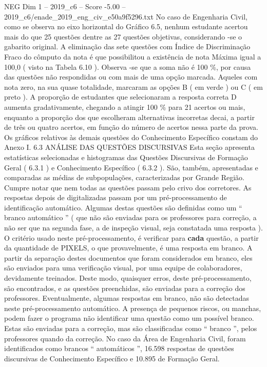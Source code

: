 \begin{textsample}{NEG Dim 1 – 2019\_c6 – Score -5.00 – 2019\_c6/enade\_2019\_eng\_civ\_e50a9f5296.txt}
No caso de Engenharia Civil, como se observa no eixo horizontal do Gráfico 6.5, nenhum estudante acertou mais do que 25 questões dentre as 27 questões objetivas, considerando -se o gabarito original.
A eliminação das sete questões com Índice de Discriminação Fraco do cômputo da nota é que possibilitou a existência de nota Máxima igual a 100,0 ( visto na Tabela 6.10 ).
Observa -se que a soma não é 100 \%, por causa das questões não respondidas ou com mais de uma opção marcada.
Aqueles com nota zero, na sua quase totalidade, marcaram as opções B ( em verde ) ou C ( em preto ).
A proporção de estudantes que selecionaram a resposta correta D aumenta gradativamente, chegando a atingir 100 \% para 21 acertos ou mais, enquanto a proporção dos que escolheram alternativas incorretas decai, a partir de três ou quatro acertos, em função do número de acertos nessa parte da prova.
Os gráficos relativos às demais questões do Conhecimento Específico constam do Anexo I. 6.3 ANÁLISE DAS QUESTÕES DISCURSIVAS Esta seção apresenta estatísticas selecionadas e histogramas das Questões Discursivas de Formação Geral ( 6.3.1 ) e Conhecimento Específico ( 6.3.2 ).
São, também, apresentadas e comparadas as médias de subpopulações, caracterizadas por Grande Região.
Cumpre notar que nem todas as questões passam pelo crivo dos corretores.
As respostas depois de digitalizadas passam por um pré-processamento de identificação automático.
Algumas destas questões são definidas como um “ branco automático ” ( que não são enviadas para os professores para correção, a não ser que na segunda fase, a de inspeção visual, seja constatada uma resposta ).
O critério usado neste pré-processamento, é verificar para \textbf{cada} questão, a partir da quantidade de PIXELS, o que provavelmente, é uma resposta em branco.
A partir da separação destes documentos que foram considerados em branco, eles são enviados para uma verificação visual, por uma equipe de colaboradores, devidamente treinados.
Deste modo, quaisquer erros, deste pré-processamento, são encontrados, e as questões preenchidas, são enviadas para a correção dos professores.
Eventualmente, algumas respostas em branco, não são detectadas neste pré-processamento automático.
A presença de pequenos riscos, ou manchas, podem fazer o programa não identificar uma questão como um possível branco.
Estas são enviadas para a correção, mas são classificadas como “ branco ”, pelos professores quando da correção.
No caso da Área de Engenharia Civil, foram identificados como brancos “ automáticos ”, 16.598 respostas de questões discursivas de Conhecimento Específico e 10.895 de Formação Geral.

\end{textsample}
